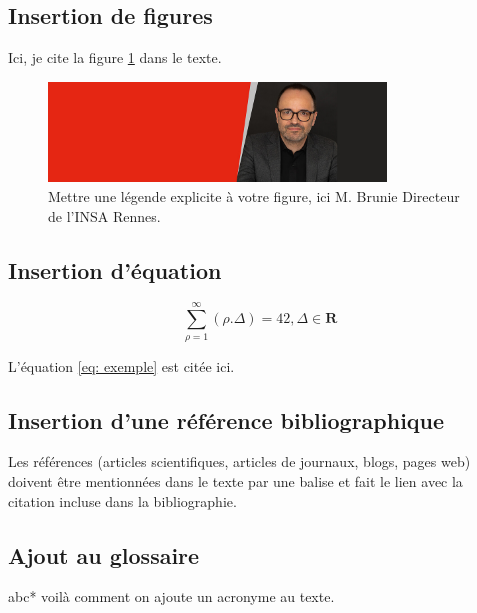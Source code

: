 \subsection{Insertion de figures}
Ici, je cite la figure \ref{fig:my_label} dans le texte.
\begin{figure}[h!]
    \centering
    \includegraphics[width=0.8\textwidth]{figures/vincent-brunie.jpg}
    \caption{Mettre une légende explicite à votre figure, ici M. Brunie Directeur de l'INSA Rennes.}
    \label{fig:my_label}
\end{figure}

\subsection{Insertion d'équation}

\begin{equation} \label{eq: exemple}
\sum_{\rho=1}^{\infty} (\rho . \Delta) = 42, \Delta \in \mathbf{R}
\end{equation}

L'équation \ref{eq: exemple} est citée ici. 

\subsection{Insertion d'une référence bibliographique}
Les références (articles scientifiques, articles de journaux, blogs, pages web) doivent être mentionnées dans le texte par une balise \cite{maref} et fait le lien avec la citation incluse dans la bibliographie.

\subsection{Ajout au glossaire}

\acrshort{abc}* voilà comment on ajoute un acronyme au texte.

